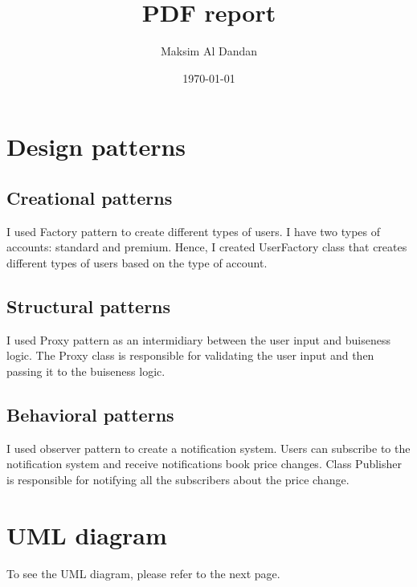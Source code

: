 \documentclass{report}
\title{PDF report}
\author{Maksim Al Dandan}
\date{\today}
\begin{document}
\maketitle
\newpage

\section*{Design patterns}
\subsection*{Creational patterns}

I used Factory pattern to create different types of users. I have two types of accounts: standard and premium. Hence, I created UserFactory class that creates different types of users based on the type of account.

\subsection*{Structural patterns}

I used Proxy pattern as an intermidiary between the user input and buiseness logic. The Proxy class is responsible for validating the user input and then passing it to the buiseness logic.

\subsection*{Behavioral patterns}

I used observer pattern to create a notification system. Users can subscribe to the notification system and receive notifications book price changes. Class Publisher is responsible for notifying all the subscribers about the price change.

\section*{UML diagram}

To see the UML diagram, please refer to the next page.
\end{document}
